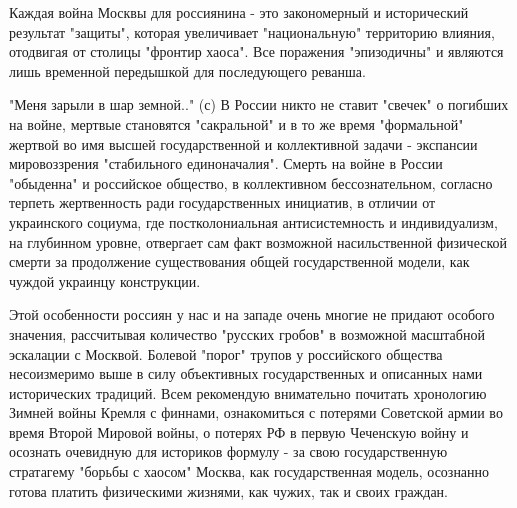 Каждая война Москвы для россиянина - это закономерный и исторический результат
"защиты", которая увеличивает "национальную" территорию влияния, отодвигая от
столицы "фронтир хаоса". Все поражения "эпизодичны" и являются лишь временной
передышкой для последующего реванша.

"Меня зарыли в шар земной.." (с) В России никто не ставит "свечек" о погибших
на войне, мертвые становятся "сакральной" и в то же время "формальной" жертвой
во имя высшей государственной и коллективной задачи - экспансии мировоззрения
"стабильного единоначалия". Смерть на войне в России "обыденна" и российское
общество, в коллективном бессознательном, согласно терпеть жертвенность ради
государственных инициатив, в отличии от украинского социума, где
постколониальная антисистемность и индивидуализм, на глубинном уровне,
отвергает сам факт возможной насильственной физической смерти за продолжение
существования общей государственной модели, как чуждой украинцу конструкции.

Этой особенности россиян у нас и на западе очень многие не придают особого
значения, рассчитывая количество "русских гробов" в возможной масштабной
эскалации с Москвой. Болевой "порог" трупов у российского общества несоизмеримо
выше в силу объективных государственных и описанных нами исторических традиций.
Всем рекомендую внимательно почитать хронологию Зимней войны Кремля с финнами,
ознакомиться с потерями Советской армии во время Второй Мировой войны, о
потерях РФ в первую Чеченскую войну и осознать очевидную для историков формулу
- за свою государственную стратагему "борьбы с хаосом" Москва, как
государственная модель, осознанно готова платить физическими жизнями, как
чужих, так и своих граждан.



